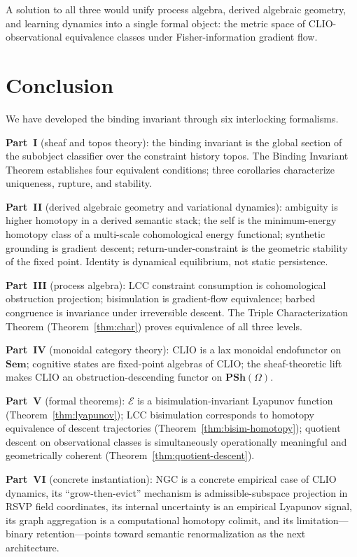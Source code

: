 \documentclass[11pt, letterpaper]{article}
\theoremstyle{plain}
\theoremstyle{definition}
\theoremstyle{remark}
\newcommand{\EE}{\mathcal{E}}
\newcommand{\PSh}{\mathbf{PSh}}
\newcommand{\Sem}{\mathbf{Sem}}
\begin{document}
A solution to all three would unify process algebra, derived algebraic geometry, and
learning dynamics into a single formal object: the metric space of CLIO-observational
equivalence classes under Fisher-information gradient flow.

\section{Conclusion}

We have developed the binding invariant through six interlocking formalisms.

\textbf{Part~I} (sheaf and topos theory): the binding invariant is the global section
of the subobject classifier over the constraint history topos. The Binding Invariant
Theorem establishes four equivalent conditions; three corollaries characterize
uniqueness, rupture, and stability.

\textbf{Part~II} (derived algebraic geometry and variational dynamics): ambiguity is
higher homotopy in a derived semantic stack; the self is the minimum-energy homotopy
class of a multi-scale cohomological energy functional; synthetic grounding is gradient
descent; return-under-constraint is the geometric stability of the fixed point. Identity
is dynamical equilibrium, not static persistence.

\textbf{Part~III} (process algebra): LCC constraint consumption is cohomological
obstruction projection; bisimulation is gradient-flow equivalence; barbed congruence is
invariance under irreversible descent. The Triple Characterization Theorem
(Theorem~\ref{thm:char}) proves equivalence of all three levels.

\textbf{Part~IV} (monoidal category theory): CLIO is a lax monoidal endofunctor on
$\Sem$; cognitive states are fixed-point algebras of CLIO; the sheaf-theoretic lift
makes CLIO an obstruction-descending functor on $\PSh(\Omega)$.

\textbf{Part~V} (formal theorems): $\EE$ is a bisimulation-invariant Lyapunov function
(Theorem~\ref{thm:lyapunov}); LCC bisimulation corresponds to homotopy equivalence of
descent trajectories (Theorem~\ref{thm:bisim-homotopy}); quotient descent on
observational classes is simultaneously operationally meaningful and geometrically
coherent (Theorem~\ref{thm:quotient-descent}).

\textbf{Part~VI} (concrete instantiation): NGC is a concrete empirical case of CLIO
dynamics, its ``grow-then-evict'' mechanism is admissible-subspace projection in RSVP
field coordinates, its internal uncertainty is an empirical Lyapunov signal, its graph
aggregation is a computational homotopy colimit, and its limitation---binary
retention---points toward semantic renormalization as the next architecture.
\end{document}
